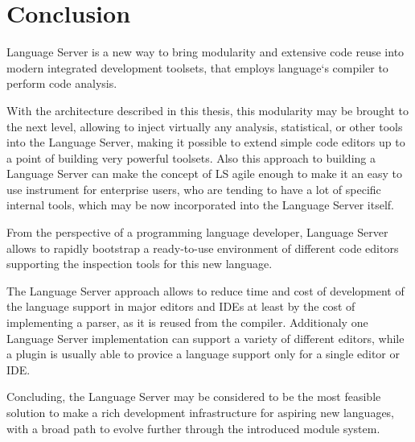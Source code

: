 \chapter{Conclusion}
\label{chap:conclusion}

Language Server is a new way to bring modularity and extensive code reuse into
modern integrated development toolsets, that employs language`s compiler to
perform code analysis.

With the architecture described in this thesis, this modularity may be brought to
the next level, allowing to inject virtually any analysis, statistical, or other
tools into the Language Server, making it possible to extend simple code editors
up to a point of building very powerful toolsets. Also this approach to building
a Language Server can make the concept of LS agile enough to make it an
easy to use instrument for enterprise users, who are tending to have a lot of specific
internal tools, which may be now incorporated into the Language Server itself.

From the perspective of a programming language developer, Language Server allows to
rapidly bootstrap a ready-to-use environment of different code editors supporting
the inspection tools for this new language.

The Language Server approach allows to reduce time and cost of development of the language support
in major editors and IDEs at least by the cost of implementing a parser, as it is reused
from the compiler. Additionaly one Language Server implementation can support a variety of
different editors, while a plugin is usually able to provice a language support only for a single editor or IDE.

Concluding, the Language Server may be considered to be the most feasible
solution to make a rich development infrastructure for aspiring new
languages, with a broad path to evolve further through the introduced module system.
